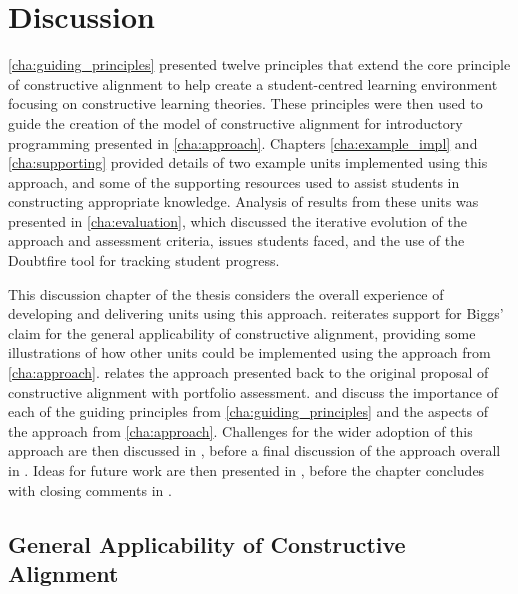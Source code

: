 
\chapter{Discussion} %
\label{cha:discussion}

\graphicspath{{Figures/Discussion/}}

\cref{cha:guiding_principles} presented twelve principles that extend the core principle of constructive alignment to help create a student-centred learning environment focusing on constructive learning theories. These principles were then used to guide the creation of the model of constructive alignment for introductory programming presented in \cref{cha:approach}. Chapters \ref{cha:example_impl} and \ref{cha:supporting} provided details of two example units implemented using this approach, and some of the supporting resources used to assist students in constructing appropriate knowledge. Analysis of results from these units was presented in \cref{cha:evaluation}, which discussed the iterative evolution of the approach and assessment criteria, issues students faced, and the use of the Doubtfire tool for tracking student progress. 

This discussion chapter of the thesis considers the overall experience of developing and delivering units using this approach.  reiterates support for Biggs' claim for the general applicability of constructive alignment, providing some illustrations of how other units could be implemented using the approach from \cref{cha:approach}.  relates the approach presented back to the original proposal of constructive alignment with portfolio assessment.  and  discuss the importance of each of the guiding principles from \cref{cha:guiding_principles} and the aspects of the approach from \cref{cha:approach}. Challenges for the wider adoption of this approach are then discussed in , before a final discussion of the approach overall in . Ideas for future work are then presented in , before the chapter concludes with closing comments in .

\clearpage

\section{General Applicability of Constructive Alignment} %
\label{sec:general_applicability_of_constructive_alignment}

